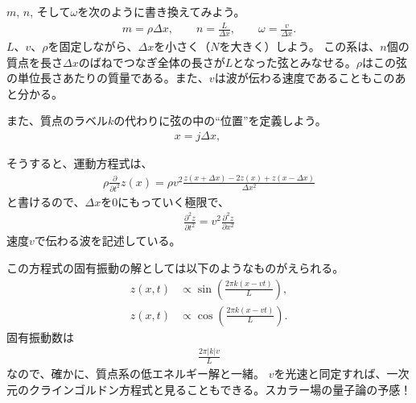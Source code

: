 \documentclass[10pt,a4paper]{jarticle}
\begin{document}
$m$, $n$, そして$\omega$を次のように書き換えてみよう。
\begin{align}
m = \rho \Delta x, \qquad
n = \frac{L}{\Delta x}, \qquad
\omega = \frac{v}{\Delta x}.
\end{align}
%
$L$、$v$、$\rho$を固定しながら、$\Delta x$を小さく（$N$を大きく）しよう。
この系は、$n$個の質点を長さ$\Delta x$のばねでつなぎ全体の長さが$L$となった弦とみなせる。$\rho$はこの弦の単位長さあたりの質量である。また、$v$は波が伝わる速度であることもこのあと分かる。

また、質点のラベル$k$の代わりに弦の中の``位置''を定義しよう。
\begin{align}
x = j \Delta x, \qquad
\end{align}

そうすると、運動方程式は、
\begin{align}
\rho \frac{\partial}{\partial t^2} z(x) = \rho v^2 \frac{z(x+\Delta x) - 2 z(x) + z(x-\Delta x)}{\Delta x^2}
\end{align}
と書けるので、$\Delta x$を0にもっていく極限で、
\begin{align}
\frac{\partial^2 z}{\partial t^2} = v^2 \frac{\partial^2 z}{\partial x^2}
\end{align}
速度$v$で伝わる波を記述している。

この方程式の固有振動の解としては以下のようなものがえられる。
\begin{align}
z(x,t) &\propto \sin\left( \frac{2 \pi k (x-vt)}{L} \right), \\
z(x,t) &\propto \cos\left( \frac{2 \pi k (x-vt)}{L} \right).
\end{align}
%
固有振動数は
\begin{align}
\frac{2\pi |k| v}{L}
\end{align}
なので、確かに、質点系の低エネルギー解と一緒。
$v$を光速と同定すれば、一次元のクラインゴルドン方程式と見ることもできる。スカラー場の量子論の予感！
\end{document}
